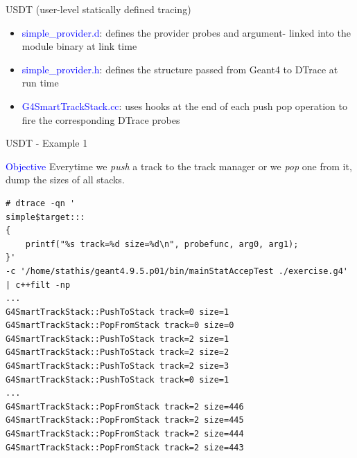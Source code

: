 \documentclass{beamer}
\begin{document}
\begin{frame}{USDT (user-level statically defined tracing)}
\begin{itemize}
\item \textcolor{blue}{simple\_provider.d}: defines the provider probes and argument-
linked into the module binary at link time
\item \textcolor{blue}{simple\_provider.h}: defines the structure passed from Geant4
to DTrace at run time
\item \textcolor{blue}{G4SmartTrackStack.cc}: uses hooks at the end of each push pop operation
to fire the corresponding DTrace probes
\end{itemize}
\end{frame}

\begin{frame}[fragile]{USDT - Example 1}
\lstset{basicstyle=\tiny\ttfamily}

\textcolor{blue}{Objective} Everytime we \textit{push} a track to the track manager or we \textit{pop} one from it,
dump the sizes of all stacks.

\lstset{frame=single, columns=flexible}
\begin{lstlisting}
# dtrace -qn '
simple$target:::
{
    printf("%s track=%d size=%d\n", probefunc, arg0, arg1);
}'
-c '/home/stathis/geant4.9.5.p01/bin/mainStatAccepTest ./exercise.g4' | c++filt -np
...
G4SmartTrackStack::PushToStack track=0 size=1
G4SmartTrackStack::PopFromStack track=0 size=0
G4SmartTrackStack::PushToStack track=2 size=1
G4SmartTrackStack::PushToStack track=2 size=2
G4SmartTrackStack::PushToStack track=2 size=3
G4SmartTrackStack::PushToStack track=0 size=1
...
G4SmartTrackStack::PopFromStack track=2 size=446
G4SmartTrackStack::PopFromStack track=2 size=445
G4SmartTrackStack::PopFromStack track=2 size=444
G4SmartTrackStack::PopFromStack track=2 size=443
\end{lstlisting}
\end{frame}
\end{document}
